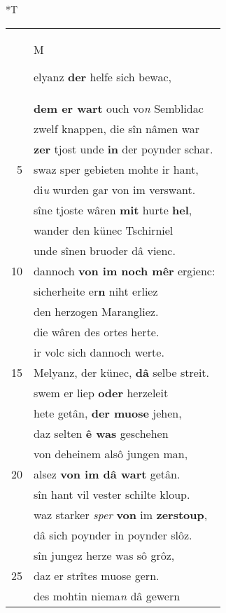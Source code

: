 \documentclass[8pt,a4paper,notitlepage]{article}
\begin{document}
\begin{table}[ht]
\begin{minipage}[t]{0.5\linewidth}
\end{minipage}
\hspace{0.5cm}
\begin{minipage}[t]{0.5\linewidth}
\small
\begin{center}*T
\end{center}
\begin{tabular}{rl}
 & \begin{large}M\end{large}elyanz \textbf{der} helfe sich bewac,\\ 
 & \textbf{dem er wart} ouch vo\textit{n} Semblidac\\ 
 & zwelf knappen, die sîn nâmen war\\ 
 & \textbf{zer} tjost unde \textbf{in} der poynder schar.\\ 
5 & swaz sper gebieten mohte ir hant,\\ 
 & di\textit{u} wurden gar von im verswant.\\ 
 & sîne tjoste wâren \textbf{mit} hurte \textbf{hel},\\ 
 & wander den künec Tschirniel\\ 
 & unde sînen bruoder dâ vienc.\\ 
10 & dannoch \textbf{von im noch mêr} ergienc:\\ 
 & sicherheite er\textbf{n} niht erliez\\ 
 & den herzogen Marangliez.\\ 
 & die wâren des ortes herte.\\ 
 & ir volc sich dannoch werte.\\ 
15 & Melyanz, der künec, \textbf{dâ} selbe streit.\\ 
 & swem er liep \textbf{oder} herzeleit\\ 
 & hete getân, \textbf{der muose} jehen,\\ 
 & daz selten \textbf{ê was} geschehen\\ 
 & von deheinem alsô jungen man,\\ 
20 & alsez \textbf{von im dâ wart} getân.\\ 
 & sîn hant vil vester schilte kloup.\\ 
 & waz starker \textit{sper} \textbf{von} im \textbf{zerstoup},\\ 
 & dâ sich poynder in poynder slôz.\\ 
 & sîn jungez herze was sô grôz,\\ 
25 & daz er strîtes muose gern.\\ 
 & des mohtin niema\textit{n} dâ gewern\\ 

\end{tabular}
\end{minipage}
\end{table}
\end{document}
